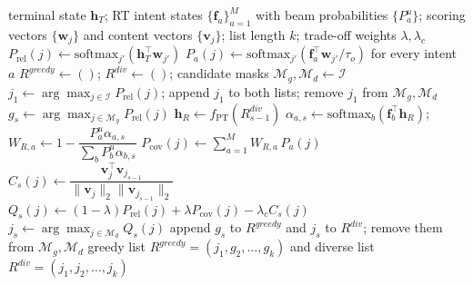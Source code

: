 \begin{algorithm*}[t]
\caption{Position-Aware Prospective List Generation}
\label{alg:pdp}
\begin{algorithmic}[1]
\Require terminal state $\mathbf{h}_T$; RT intent states $\{\mathbf{f}_a\}_{a=1}^{M}$ with beam probabilities $\{P_a^u\}$; scoring vectors $\{\mathbf{w}_j\}$ and content vectors $\{\mathbf{v}_j\}$; list length $k$; trade-off weights $\lambda, \lambda_c$
\State $P_{\mathrm{rel}}(j) \gets \mathrm{softmax}_{j'}\!\left(\mathbf{h}_T^\top \mathbf{w}_{j'}\right)$
\State $P_a(j) \gets \mathrm{softmax}_{j'}\!\left(\mathbf{f}_a^\top \mathbf{w}_{j'}/\tau_o\right)$ for every intent $a$ 
\State $R^{greedy} \gets ()$; $R^{div} \gets ()$; candidate masks $\mathcal{M}_g, \mathcal{M}_d \gets \mathcal{I}$
\State $j_1 \gets \arg\max_{j \in \mathcal{I}} P_{\mathrm{rel}}(j)$; append $j_1$ to both lists; remove $j_1$ from $\mathcal{M}_g,\mathcal{M}_d$
  \State $g_s \gets \arg\max_{j \in \mathcal{M}_g} P_{\mathrm{rel}}(j)$ 
  \State $\mathbf{h}_R \gets f_{\mathrm{PT}}(R^{div}_{s-1})$ 
  \State $\alpha_{a,s} \gets \mathrm{softmax}_{b}\!\left(\mathbf{f}_b^\top \mathbf{h}_R\right)$;\quad
         $W_{R,a} \gets 1 - \dfrac{P_a^u \alpha_{a,s}}{\sum_{b} P_b^u \alpha_{b,s}}$
  \State $P_{\mathrm{cov}}(j) \gets \sum_{a=1}^{M} W_{R,a}\, P_a(j)$
  \State $C_s(j) \gets \dfrac{\mathbf{v}_j^\top \mathbf{v}_{j_{s-1}}}{\lVert \mathbf{v}_j \rVert_2 \lVert \mathbf{v}_{j_{s-1}} \rVert_2}$ 
  \State $Q_s(j) \gets (1-\lambda) P_{\mathrm{rel}}(j) + \lambda P_{\mathrm{cov}}(j) - \lambda_c C_s(j)$
  \State $j_s \gets \arg\max_{j \in \mathcal{M}_d} Q_s(j)$ 
  \State append $g_s$ to $R^{greedy}$ and $j_s$ to $R^{div}$; remove them from $\mathcal{M}_g,\mathcal{M}_d$
\EndFor
\Ensure greedy list $R^{greedy} = (j_1, g_2, \ldots, g_k)$ and diverse list $R^{div} = (j_1, j_2, \ldots, j_k)$
\end{algorithmic}
\end{algorithm*}

